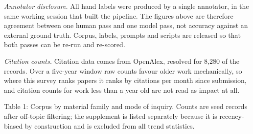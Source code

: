 \documentclass[
  11pt,
]{article}
\begin{document}
\emph{Annotator disclosure.} All hand labels were produced by a single
annotator, in the same working session that built the pipeline. The
figures above are therefore agreement between one human pass and one
model pass, not accuracy against an external ground truth. Corpus,
labels, prompts and scripts are released so that both passes can be
re-run and re-scored.

\emph{Citation counts.} Citation data comes from OpenAlex, resolved for
8,280 of the records. Over a five-year window raw counts favour older
work mechanically, so where this survey ranks papers it ranks by
citations per month since submission, and citation counts for work less
than a year old are not read as impact at all.

Table 1: Corpus by material family and mode of inquiry. Counts are seed
records after off-topic filtering; the supplement is listed separately
because it is recency-biased by construction and is excluded from all
trend statistics.
\end{document}
